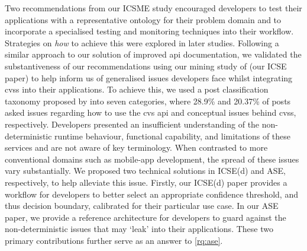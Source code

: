 Two recommendations from our ICSME study encouraged developers to test their applications with a representative ontology for their problem domain and to incorporate a specialised testing and monitoring techniques into their workflow. Strategies on \textit{how} to achieve this were explored in later studies.  Following a similar approach to our solution of improved \gls{api} documentation, we validated the substantiveness of our recommendations using our mining study of  (our ICSE paper) to help inform us of generalised issues developers face whilst integrating \glspl{cvs} into their applications. To achieve this, we used a  post classification taxonomy proposed by \citet{Beyer:2018fm} into seven categories, where 28.9\% and 20.37\% of posts asked issues regarding how to use the \gls{cvs} \gls{api} and conceptual issues behind \glspl{cvs}, respectively. Developers presented an insufficient understanding of the non-deterministic runtime behaviour, functional capability, and limitations of these services and are not aware of key  terminology. When contrasted to more conventional domains such as mobile-app development, the spread of these issues vary substantially. We proposed two technical solutions in ICSE(d) and ASE, respectively, to help alleviate this issue.  Firstly, our ICSE(d) paper provides a workflow for developers to better select an appropriate confidence threshold, and thus decision boundary, calibrated for their particular use case. In our ASE paper, we provide a reference architecture for developers to guard against the non-deterministic issues that may `leak' into their applications. These two primary contributions further serve as an answer to \ref{rq:ase}.


